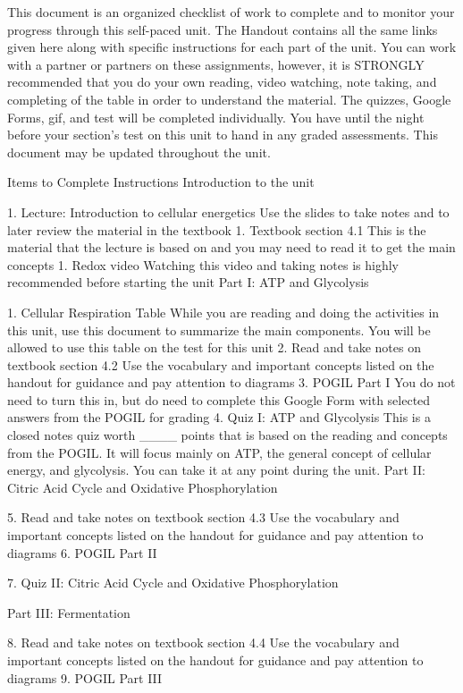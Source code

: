 ﻿This document is an organized checklist of work to complete and to monitor your progress through this self-paced unit. The Handout contains all the same links given here along with specific instructions for each part of the unit. You can work with a partner or partners on these assignments, however, it is STRONGLY recommended that you do your own reading, video watching, note taking, and completing of the table in order to understand the material. The quizzes, Google Forms, gif, and test will be completed individually. You have until the night before your section’s test on this unit to hand in any graded assessments. This document may be updated throughout the unit.


Items to Complete
	Instructions
	Introduction to the unit
	

	1. Lecture: Introduction to cellular energetics
	Use the slides to take notes and to later review the material in the textbook
	1. Textbook section 4.1 
	This is the material that the lecture is based on and you may need to read it to get the main concepts
	1. Redox video
	Watching this video and taking notes is highly recommended before starting the unit
	Part I: ATP and Glycolysis
	

	1. Cellular Respiration Table
	While you are reading and doing the activities in this unit, use this document to summarize the main components. You will be allowed to use this table on the test for this unit
	2. Read and take notes on textbook section 4.2
	Use the vocabulary and important concepts listed on the handout for guidance and pay attention to diagrams
	3. POGIL Part I
	You do not need to turn this in, but do need to complete this Google Form with selected answers from the POGIL for grading
	4. Quiz I: ATP and Glycolysis
	This is a closed notes quiz worth ____ points that is based on the reading and concepts from the POGIL. It will focus mainly on ATP, the general concept of cellular energy, and glycolysis. You can take it at any point during the unit.
	Part II: Citric Acid Cycle and Oxidative Phosphorylation 
	

	5. Read and take notes on textbook section 4.3
	Use the vocabulary and important concepts listed on the handout for guidance and pay attention to diagrams
	6. POGIL Part II
	

	7. Quiz II: Citric Acid Cycle and Oxidative Phosphorylation
	

	Part III: Fermentation
	

	8. Read and take notes on textbook section 4.4
	Use the vocabulary and important concepts listed on the handout for guidance and pay attention to diagrams
	9. POGIL Part III
	

